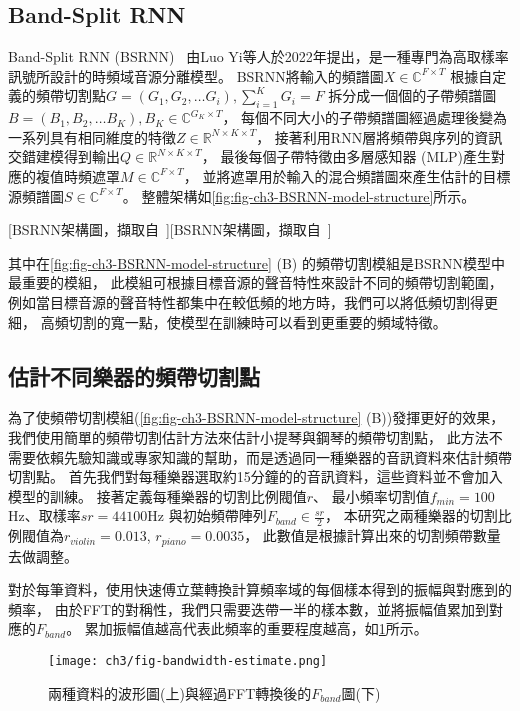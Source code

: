 \documentclass[class=NCU_thesis, crop=false]{standalone}
\begin{document}
\subsection{Band-Split RNN} \label{ch3-subst-band-split-RNN}
Band-Split RNN (BSRNN)~\cite{Luo_Yi2022MusicSourceSeparation}
由Luo Yi等人於2022年提出，是一種專門為高取樣率訊號所設計的時頻域音源分離模型。
BSRNN將輸入的頻譜圖$X\in \mathbb{C} ^{F\times T}$
根據自定義的頻帶切割點$G = (G_1, G_2, \dots G_i), \sum_{i = 1}^{K} G_i = F $
拆分成一個個的子帶頻譜圖$B = (B_1, B_2, \dots B_K), B_K \in \mathbb{C}^{G_K\times T}$，
每個不同大小的子帶頻譜圖經過處理後變為一系列具有相同維度的特徵$Z\in \mathbb{R}^{N\times K\times T}$，
接著利用RNN層將頻帶與序列的資訊交錯建模得到輸出$Q\in \mathbb{R}^{N\times K\times T}$，
最後每個子帶特徵由多層感知器 (MLP)產生對應的複值時頻遮罩$M\in \mathbb{C}^{F\times T}$，
並將遮罩用於輸入的混合頻譜圖來產生估計的目標源頻譜圖$S\in \mathbb{C}^{F\times T}$。
整體架構如\cref{fig:fig-ch3-BSRNN-model-structure}所示。

[BSRNN架構圖，擷取自~\cite{Luo_Yi2022MusicSourceSeparation}][BSRNN架構圖，擷取自~\cite{Luo_Yi2022MusicSourceSeparation}]

其中在\cref{fig:fig-ch3-BSRNN-model-structure} (B) 
的頻帶切割模組是BSRNN模型中最重要的模組，
此模組可根據目標音源的聲音特性來設計不同的頻帶切割範圍，
例如當目標音源的聲音特性都集中在較低頻的地方時，我們可以將低頻切割得更細，
高頻切割的寬一點，使模型在訓練時可以看到更重要的頻域特徵。

\subsection{估計不同樂器的頻帶切割點} \label{ch3-subst-estimate-band-split-point}
為了使頻帶切割模組(\cref{fig:fig-ch3-BSRNN-model-structure} (B))發揮更好的效果，
我們使用簡單的頻帶切割估計方法來估計小提琴與鋼琴的頻帶切割點，
此方法不需要依賴先驗知識或專家知識的幫助，而是透過同一種樂器的音訊資料來估計頻帶切割點。
首先我們對每種樂器選取約15分鐘的的音訊資料，這些資料並不會加入模型的訓練。
接著定義每種樂器的切割比例閥值$r$、
最小頻率切割值$f_{min}=100$Hz、取樣率$sr = 44100$Hz
與初始頻帶陣列$F_{band} \in \frac{sr}{2} $，
本研究之兩種樂器的切割比例閥值為$r_{violin}=0.013$, $r_{piano}=0.0035$，
此數值是根據計算出來的切割頻帶數量去做調整。

對於每筆資料，使用快速傅立葉轉換計算頻率域的每個樣本得到的振幅與對應到的頻率，
由於FFT的對稱性，我們只需要迭帶一半的樣本數，並將振幅值累加到對應的$F_{band}$。
累加振幅值越高代表此頻率的重要程度越高，如\cref{fig:fig-ch3-bandwidth-estimate}所示。
\begin{figure}[H]
    \centering
    \texttt{[image: ch3/fig-bandwidth-estimate.png]}
    \caption{兩種資料的波形圖(上)與經過FFT轉換後的$F_{band}$圖(下)}
    \label{fig:fig-ch3-bandwidth-estimate}
\end{figure}
\end{document}
